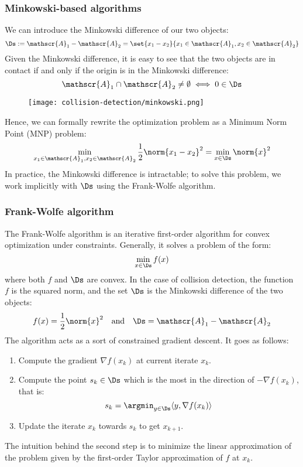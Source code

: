 \subsubsection{Minkowski-based algorithms}
We can introduce the Minkowski difference of our two objects:
\begin{equation*}
    \Ds := \mathscr{A}_1 - \mathscr{A}_2 = \set{x_1-x_2}{x_1\in\mathscr{A}_1, x_2\in\mathscr{A}_2}
\end{equation*}
Given the Minkowski difference, it is easy to see that the two objects are in contact if and only if the origin is in the Minkowski difference:
\begin{equation*}
    \mathscr{A}_1\cap\mathscr{A}_2\neq\emptyset \iff 0\in\Ds
\end{equation*}
\begin{figure}[H]
    \centering
    \texttt{[image: collision-detection/minkowski.png]}
\end{figure}
Hence, we can formally rewrite the optimization problem as a Minimum Norm Point (MNP) problem:
\begin{equation*}
    \min_{x_1\in\mathscr{A}_1, x_2\in\mathscr{A}_2} \frac{1}{2}\norm{x_1-x_2}^2 = \min_{x\in\Ds} \norm{x}^2
\end{equation*}
In practice, the Minkowski difference is intractable; to solve this problem, we work implicitly with $\Ds$ using the Frank-Wolfe algorithm.

\subsubsection{Frank-Wolfe algorithm}
The Frank-Wolfe algorithm is an iterative first-order algorithm for convex optimization under constraints. Generally, it solves a problem of the form:
\begin{equation*}
    \min_{x\in\Ds} f(x)
\end{equation*}
where both $f$ and $\Ds$ are convex. In the case of collision detection, the function $f$ is the squared norm, and the set $\Ds$ is the Minkowski difference of the two objects:
\begin{equation*}
    f(x) = \frac{1}{2}\norm{x}^2 \quad \text{and} \quad \Ds = \mathscr{A}_1 - \mathscr{A}_2
\end{equation*}
The algorithm acts as a sort of constrained gradient descent. It goes as follows:
\begin{enumerate}
    \item Compute the gradient $\nabla f(x_k)$ at current iterate $x_k$.
    \item Compute the point $s_k\in\Ds$ which is the most in the direction of $-\nabla f(x_k)$, that is:
    \begin{equation*}
        s_k = \argmin_{y\in\Ds} \langle y, \nabla f(x_k)\rangle
    \end{equation*}
    \item Update the iterate $x_k$ towards $s_k$ to get $x_{k+1}$.
\end{enumerate}
The intuition behind the second step is to minimize the linear approximation of the problem given by the first-order Taylor approximation of $f$ at $x_k$.

